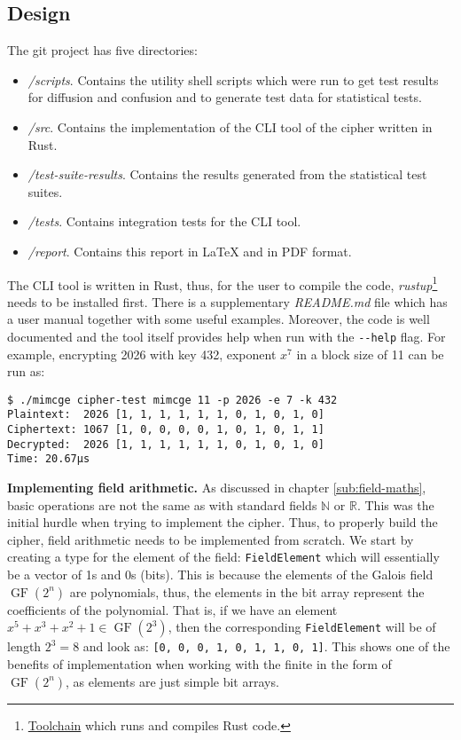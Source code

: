 \documentclass{Resources/UoBLab1}
\theoremstyle{definition}
\begin{document}
\subsection{Design}\label{sub:finite-field-impl}
The git project has five directories:
\begin{itemize}
    \item \textit{/scripts}. Contains the utility shell scripts which were run to get test results for diffusion and confusion and to generate test data for statistical tests.
    \item \textit{/src}. Contains the implementation of the CLI tool of the cipher written in Rust.
    \item \textit{/test-suite-results}. Contains the results generated from the statistical test suites.
    \item \textit{/tests}. Contains integration tests for the CLI tool.
    \item \textit{/report}. Contains this report in \LaTeX{} and in PDF format.
\end{itemize}
The CLI tool is written in Rust, thus, for the user to compile the code, \textit{rustup}\footnote{\href{https://www.rust-lang.org/tools/install}{Toolchain} which runs and compiles Rust code.} needs to be installed first. There is a supplementary \textit{README.md} file which has a user manual together with some useful examples. Moreover, the code is well documented and the tool itself provides help when run with the \verb|--help| flag. For example, encrypting 2026 with key 432, exponent $x^7$ in a block size of 11 can be run as:
\begin{verbatim}
$ ./mimcge cipher-test mimcge 11 -p 2026 -e 7 -k 432
Plaintext:  2026 [1, 1, 1, 1, 1, 1, 0, 1, 0, 1, 0]
Ciphertext: 1067 [1, 0, 0, 0, 0, 1, 0, 1, 0, 1, 1]
Decrypted:  2026 [1, 1, 1, 1, 1, 1, 0, 1, 0, 1, 0]
Time: 20.67µs
\end{verbatim}
\medskip

\noindent\textbf{Implementing field arithmetic.} As discussed in chapter \ref{sub:field-maths}, basic operations are not the same as with standard fields $\mathbb{N}$ or $\mathbb{R}$. This was the initial hurdle when trying to implement the cipher. Thus, to properly build the cipher, field arithmetic needs to be implemented from scratch. We start by creating a type for the element of the field: \verb|FieldElement| which will essentially be a vector of 1s and 0s (bits). This is because the elements of the Galois field $\operatorname{GF}(2^n)$ are polynomials, thus, the elements in the bit array represent the coefficients of the polynomial. That is, if we have an element $x^5+x^3+x^2+1 \in \operatorname{GF}(2^3)$, then the corresponding \verb|FieldElement| will be of length $2^3 = 8$ and look as: \verb|[0, 0, 0, 1, 0, 1, 1, 0, 1]|. This shows one of the benefits of implementation when working with the finite in the form of $\operatorname{GF}(2^n)$, as elements are just simple bit arrays. 
\end{document}
